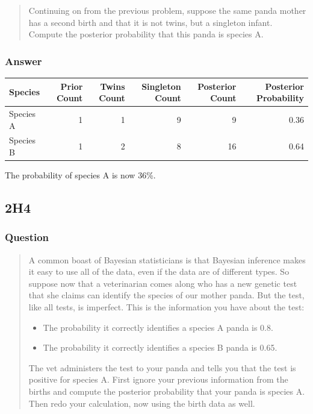 \documentclass[
]{book}
\providecommand{\tightlist}{%
  \setlength{\itemsep}{0pt}\setlength{\parskip}{0pt}}
\begin{document}
\begin{quote}
Continuing on from the previous problem, suppose the same panda mother has a second birth and that it is not twins, but a singleton infant. Compute the posterior probability that this panda is species A.
\end{quote}

\hypertarget{answer-13}{%
\subsubsection*{Answer}\label{answer-13}}

\begin{tabular}{l|r|r|r|r|r}
\hline
Species & Prior Count & Twins Count & Singleton Count & Posterior Count & Posterior Probability\\
\hline
Species A & 1 & 1 & 9 & 9 & 0.36\\
\hline
Species B & 1 & 2 & 8 & 16 & 0.64\\
\hline
\end{tabular}

The probability of species A is now 36\%.

\hypertarget{h4}{%
\subsection*{2H4}\label{h4}}

\hypertarget{question-14}{%
\subsubsection*{Question}\label{question-14}}

\begin{quote}
A common boast of Bayesian statisticians is that Bayesian inference makes it easy to use all of the data, even if the data are of different types. So suppose now that a veterinarian comes along who has a new genetic test that she claims can identify the species of our mother panda. But the test, like all tests, is imperfect. This is the information you have about the test:

\begin{itemize}
\tightlist
\item
  The probability it correctly identifies a species A panda is 0.8.
\item
  The probability it correctly identifies a species B panda is 0.65.
\end{itemize}

The vet administers the test to your panda and tells you that the test is positive for species A. First ignore your previous information from the births and compute the posterior probability that your panda is species A. Then redo your calculation, now using the birth data as well.
\end{quote}
\end{document}
